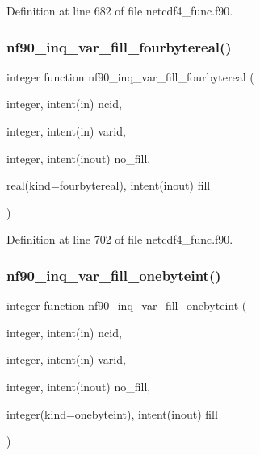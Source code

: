 Definition at line 682 of file netcdf4\+\_\+func.\+f90.

\mbox{\label{netcdf4__func_8f90_a8afc8107388774b13823583c8940a301}} 
\subsubsection{\texorpdfstring{nf90\+\_\+inq\+\_\+var\+\_\+fill\+\_\+fourbytereal()}{nf90\_inq\_var\_fill\_fourbytereal()}}
{\footnotesize\ttfamily integer function nf90\+\_\+inq\+\_\+var\+\_\+fill\+\_\+fourbytereal (\begin{DoxyParamCaption}\item[{integer, intent(in)}]{ncid,  }\item[{integer, intent(in)}]{varid,  }\item[{integer, intent(inout)}]{no\+\_\+fill,  }\item[{real(kind=fourbytereal), intent(inout)}]{fill }\end{DoxyParamCaption})}



Definition at line 702 of file netcdf4\+\_\+func.\+f90.

\mbox{\label{netcdf4__func_8f90_a5a539dd54d111550f67c380b341689d2}} 
\subsubsection{\texorpdfstring{nf90\+\_\+inq\+\_\+var\+\_\+fill\+\_\+onebyteint()}{nf90\_inq\_var\_fill\_onebyteint()}}
{\footnotesize\ttfamily integer function nf90\+\_\+inq\+\_\+var\+\_\+fill\+\_\+onebyteint (\begin{DoxyParamCaption}\item[{integer, intent(in)}]{ncid,  }\item[{integer, intent(in)}]{varid,  }\item[{integer, intent(inout)}]{no\+\_\+fill,  }\item[{integer(kind=onebyteint), intent(inout)}]{fill }\end{DoxyParamCaption})}



